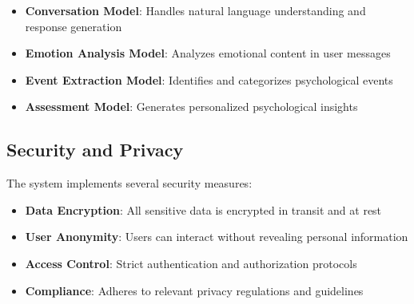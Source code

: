 \begin{itemize}
    \item \textbf{Conversation Model}: Handles natural language understanding and response generation
    \item \textbf{Emotion Analysis Model}: Analyzes emotional content in user messages
    \item \textbf{Event Extraction Model}: Identifies and categorizes psychological events
    \item \textbf{Assessment Model}: Generates personalized psychological insights
\end{itemize}

\subsection{Security and Privacy}

The system implements several security measures:

\begin{itemize}
    \item \textbf{Data Encryption}: All sensitive data is encrypted in transit and at rest
    \item \textbf{User Anonymity}: Users can interact without revealing personal information
    \item \textbf{Access Control}: Strict authentication and authorization protocols
    \item \textbf{Compliance}: Adheres to relevant privacy regulations and guidelines
\end{itemize} 